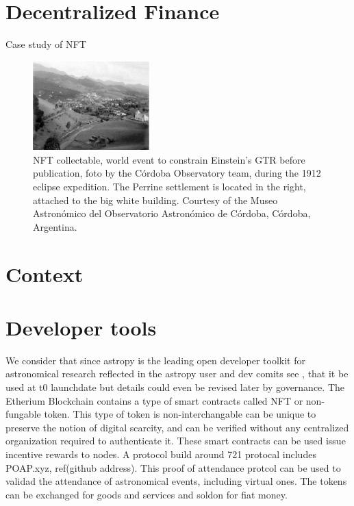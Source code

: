 \documentclass[final,5p,times,twocolumn,authoryear]{elsarticle}
\begin{document}
\section{Decentralized Finance} 

Case study of NFT
\begin{figure}[h!]
    \centering
    \label{fig:my_label}
  \caption{NFT collectable, world event to constrain Einstein's GTR before publication, foto by the C\'ordoba Observatory team,
during the 1912 eclipse expedition. The Perrine settlement is located in the right, attached to the big white building. Courtesy of the Museo Astron\'omico del Observatorio Astron\'omico de C\'ordoba, C\'ordoba, Argentina.}
  \includegraphics[width=0.4\textwidth]{figs/p1912.eps}
\end{figure}



\section{Context}
\label{section:context}
%


\section{Developer tools}
\label{section:Eth721}
%
We consider that since astropy is the leading open developer toolkit for astronomical research reflected in the astropy  user and dev comits see \cite{ 2020ASPC..522..491T}, that it be used at t0 launchdate but details could even be revised later by governance.  The Etherium Blockchain contains a type of smart contracts called NFT or non-fungable token.  This type of token is non-interchangable can be unique to preserve the notion of digital scarcity, and can be verified without any centralized organization required to authenticate it. These smart contracts can be used issue incentive rewards to nodes. A protocol build around 721 protocal includes POAP.xyz, ref(github address). This proof of attendance protcol can be used to validad the attendance of astronomical events, including virtual ones. The tokens can be exchanged for goods and services and soldon for fiat money.  
\end{document}
